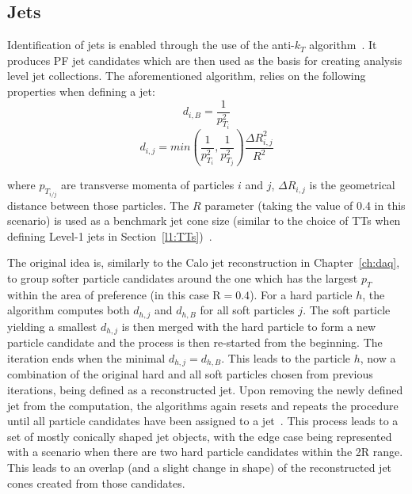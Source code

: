 \subsection{Jets}
\label{sec:jets}
\hspace{10pt} Identification of jets is enabled through the use of the anti-$k_T$ algorithm~\cite{anti_kt}. It produces PF jet candidates which are then used as the basis for creating analysis level jet collections. The aforementioned algorithm, relies on the following properties when defining a jet:
\begin{equation}
    d_{i,B} = \frac{1}{p_{T_i}^2}
\end{equation}
\begin{equation}
    d_{i,j} = min\left (\frac{1}{p_{T_{i}}^2}, \frac{1}{p_{T_{j}}^2}\right )\frac{\Delta R_{i,j}^2}{R^2}
\end{equation}

where $p_{T_{i/j}}$ are transverse momenta of particles $i$ and $j$, $\Delta R_{i,j}$ is the geometrical distance between those particles. The $R$ parameter (taking the value of 0.4 in this scenario) is used as a benchmark jet cone size (similar to the choice of TTs when defining Level-1 jets in Section~\ref{l1:TTs})~\cite{note:AN_19_257}.  

\hspace{10pt} The original idea is, similarly to the Calo jet reconstruction in Chapter~\ref{ch:daq}, to group softer particle candidates around the one which has the largest $p_{T}$  within the area of preference (in this case R$=0.4$). For a hard particle $h$, the algorithm computes both $d_{h,j}$ and $d_{h,B}$ for all soft particles $j$. The soft particle yielding a smallest $d_{h,j}$ is then merged with the hard particle to form a new particle candidate and the process is then re-started from the beginning. The iteration ends when the minimal $d_{h,j}=d_{h,B}$. This leads to the particle $h$, now a combination of the original hard and all soft particles chosen from previous iterations, being defined as a reconstructed jet. Upon removing the newly defined jet from the computation, the algorithms again resets and repeats the procedure until all particle candidates have been assigned to a jet~\cite{Patrick,anti_kt}. This process leads to a set of mostly conically shaped jet objects, with the edge case being represented with a scenario when there are two hard particle candidates within the 2R range. This leads to an overlap (and a slight change in shape) of the reconstructed jet cones created from those candidates.

